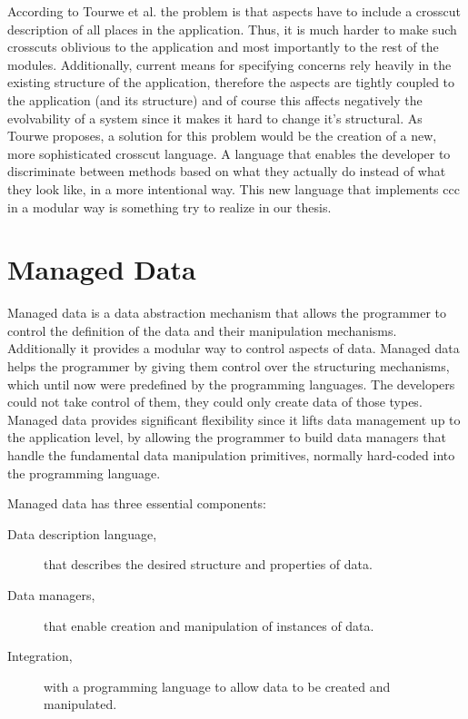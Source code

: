 According to Tourwe et al. \cite{tourwe2003existence} the problem is that aspects have to include a crosscut description of all places in the application.
Thus, it is much harder to make such crosscuts oblivious to the application and most importantly to the rest of the modules. 
Additionally, current means for specifying concerns rely heavily in the existing structure of the application, therefore the aspects are tightly coupled to the application (and its structure) and of course this affects negatively the evolvability of a system since it makes it hard to change it's structural.
As Tourwe \cite{tourwe2003existence} proposes, a solution for this problem would be the creation of a new, more sophisticated crosscut language. 
A language that enables the developer to discriminate between methods based on what they actually do instead of what they look like, in a more intentional way.
This new language that implements \ac{ccc} in a modular way is something try to realize in our thesis.

\section{Managed Data}\label{Managed Data}
Managed data \cite{loh2012managed} is a data abstraction mechanism that allows the programmer to control the definition of the data and their manipulation mechanisms. 
Additionally it provides a modular way to control aspects of data.
Managed data helps the programmer by giving them control over the structuring mechanisms, which until now were predefined by the programming languages. 
The developers could not take control of them, they could only create data of those types.
Managed data provides significant flexibility since it lifts data management up to the application level, by allowing the programmer to build data managers that handle the fundamental data manipulation primitives, normally hard-coded into the programming language. 

Managed data has three essential components:

\begin{description}
	\item [Data description language,] that describes the desired structure and properties of data.

	\item [Data managers,] that enable creation and manipulation of instances of data.

	\item [Integration,] with a programming language to allow data to be created and manipulated.
\end{description}

